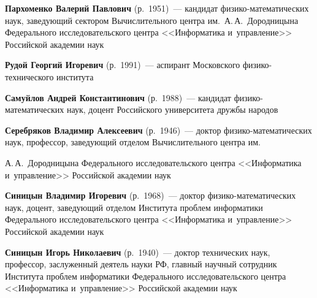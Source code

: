 \begin{multicols}{2}
\vspace*{3pt}

\noindent
\textbf{Пархоменко Валерий Павлович} (р.\ 1951)~--- 
кандидат  фи\-зи\-ко-ма\-те\-ма\-ти\-че\-ских 
наук, за\-ве\-ду\-ющий сектором Вычислительного центра им.\ А.\,А.~Дородницына 
Федерального исследовательского центра <<Информатика и~управ\-ле\-ние>> 
Российской академии наук

\vspace*{3pt}

\noindent
\textbf{Рудой Георгий Игоревич} (р.\ 1991)~--- 
аспирант Мос\-ков\-ско\-го фи\-зи\-ко-тех\-ни\-че\-ского института


\vspace*{3pt}

\noindent
\textbf{Самуйлов Андрей Константинович} (р.\ 1988)~--- 
кандидат фи\-зи\-ко-ма\-те\-ма\-ти\-че\-ских наук, 
доцент Российского университета дружбы народов

\vspace*{3pt}

\noindent
\textbf{Серебряков Владимир Алексеевич} (р.\ 1946)~--- 
доктор фи\-зи\-ко-ма\-те\-ма\-ти\-че\-ских наук, 
профессор, за\-ве\-ду\-ющий отделом Вы\-чис\-ли\-тель\-но\-го центра им.\linebreak\vspace*{-12pt}

\pagebreak

\noindent
 А.\,А.~Дородницына 
Федерального исследовательского центра <<Информатика и~управ\-ле\-ние>> 
Российской академии наук

\vspace*{3pt}

\noindent
\textbf{Синицын Владимир Игоревич} (р.\ 1968)~--- 
доктор фи\-зи\-ко-ма\-те\-ма\-ти\-че\-ских наук, 
доцент, заведующий
 отделом Института проб\-лем информатики Федерального 
 исследовательского центра <<Информатика и~управ\-ление>> Российской академии наук
 
\vspace*{3pt}



\noindent
\textbf{Синицын Игорь Николаевич} (р.\ 1940)~--- 
доктор технических наук, профессор, заслуженный деятель науки РФ, главный научный 
сотрудник Института проб\-лем информатики Федерального 
 исследовательского центра <<Информатика и~управ\-ление>> Российской академии наук
 
\vspace*{3pt}




\end{multicols}
